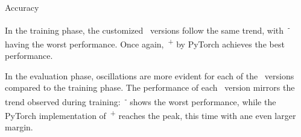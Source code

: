 \begin{subsection}{Accuracy}
    \begin{figure}[h!]
        \centering
        \begin{subfigure}[b]{0.48\textwidth}
            \centering
            
            \label{fig:training_accuracy}
        \end{subfigure}
        \hfill
        \begin{subfigure}[b]{0.48\textwidth}
            \centering
            
            \label{fig:evaluation_accuracy}
        \end{subfigure}
    \end{figure}
    \par In the training phase, the customized~ versions follow the same trend, with~\textsuperscript{-} having the worst performance. Once again,~\textsuperscript{+} by PyTorch achieves the best performance.\\
    \par In the evaluation phase, oscillations are more evident for each of the~ versions compared to the training phase. The performance of each~ version mirrors the trend observed during training:~\textsuperscript{-} shows the worst performance, while the PyTorch implementation of~\textsuperscript{+} reaches the peak, this time with ane even larger margin.
\end{subsection}